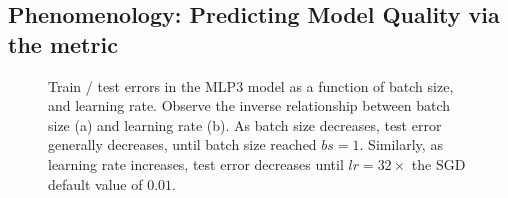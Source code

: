 
\subsection{\HTSR Phenomenology: Predicting Model Quality via the \ALPHA metric}
\label{sxn:empirical-test_acc}

\begin{figure}[t]
  \center
  \caption{Train / test errors in the MLP3 model as a function of batch size, and learning rate. Observe the inverse relationship between batch size (a) and learning rate (b). As batch size decreases, test error generally decreases, until batch size reached $bs=1$. Similarly, as learning rate increases, test error decreases until $lr=32\times$ the SGD default value of $0.01$.
  }
  \label{fig:mlp3-accuracies}
\end{figure}

